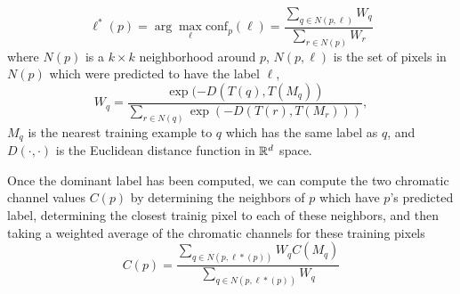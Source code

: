 \begin{equation}
    \ell^*(p) = \arg\max_\ell \text{conf}_p(\ell) = \frac{\sum_{q \in N(p, \ell)} W_q}{\sum_{r \in N(p)} W_r}
\end{equation}
where $N(p)$ is a $k \times k$ neighborhood around $p$, $N(p, \ell)$ is the set of pixels in $N(p)$ which were predicted to have the label $\ell$,
\begin{equation}
    W_q = \frac{\exp (-D(T(q), T(M_q))}{\sum_{r \in N(q)} \exp (-D(T(r), T(M_r)))},
\end{equation}
$M_q$ is the nearest training example to $q$ which has the same label as $q$, and $D(\cdot, \cdot)$ is the Euclidean distance function in $\mathbb{R}^d$ space.

Once the dominant label has been computed, we can compute the two chromatic channel values $C(p)$ by determining the neighbors of $p$ which have $p$'s predicted label, determining the closest trainig pixel to each of these neighbors, and then taking a weighted average of the chromatic channels for these training pixels
\begin{equation}
    C(p) = \frac{\sum_{q \in N(p, \ell*(p))} W_q C(M_q)}{\sum_{q \in N(p, \ell*(p))} W_q}
\end{equation}